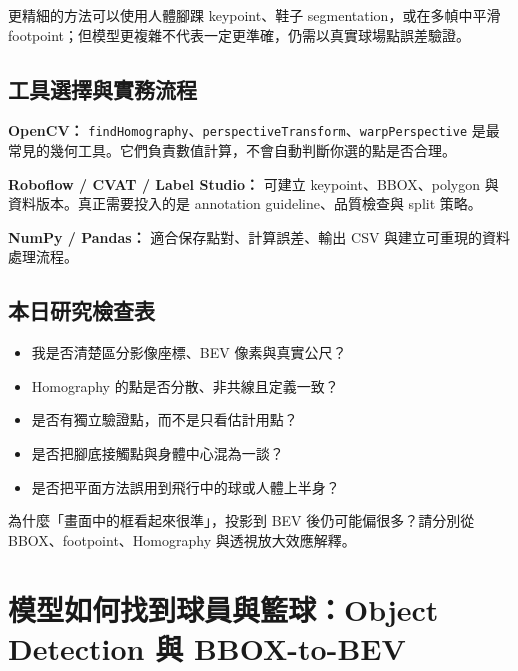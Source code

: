 \documentclass[11pt,a4paper,oneside]{report}
\begin{document}
更精細的方法可以使用人體腳踝 keypoint、鞋子 segmentation，或在多幀中平滑 footpoint；但模型更複雜不代表一定更準確，仍需以真實球場點誤差驗證。


\section{工具選擇與實務流程}


\begin{toolBox}
\textbf{OpenCV：}\quad
\texttt{findHomography}、\texttt{perspectiveTransform}、\texttt{warpPerspective} 是最常見的幾何工具。它們負責數值計算，不會自動判斷你選的點是否合理。

\textbf{Roboflow / CVAT / Label Studio：}\quad
可建立 keypoint、BBOX、polygon 與資料版本。真正需要投入的是 annotation guideline、品質檢查與 split 策略。

\textbf{NumPy / Pandas：}\quad
適合保存點對、計算誤差、輸出 CSV 與建立可重現的資料處理流程。
\end{toolBox}

\section{本日研究檢查表}

\begin{takeawayBox}
\begin{itemize}
  \item 我是否清楚區分影像座標、BEV 像素與真實公尺？
  \item Homography 的點是否分散、非共線且定義一致？
  \item 是否有獨立驗證點，而不是只看估計用點？
  \item 是否把腳底接觸點與身體中心混為一談？
  \item 是否把平面方法誤用到飛行中的球或人體上半身？
\end{itemize}
\end{takeawayBox}

\begin{questionBox}
為什麼「畫面中的框看起來很準」，投影到 BEV 後仍可能偏很多？請分別從 BBOX、footpoint、Homography 與透視放大效應解釋。
\end{questionBox}

\chapter{模型如何找到球員與籃球：Object Detection 與 BBOX-to-BEV}
\end{document}
